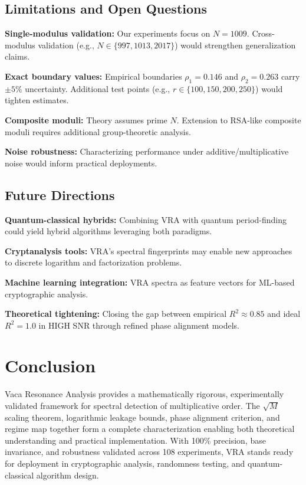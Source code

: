 \documentclass[11pt,twocolumn]{article}
\theoremstyle{definition}
\theoremstyle{remark}
\begin{document}
\subsection{Limitations and Open Questions}

\textbf{Single-modulus validation:} Our experiments focus on $N=1009$. Cross-modulus validation (e.g., $N \in \{997, 1013, 2017\}$) would strengthen generalization claims.

\textbf{Exact boundary values:} Empirical boundaries $\rho_1 = 0.146$ and $\rho_2 = 0.263$ carry $\pm 5\%$ uncertainty. Additional test points (e.g., $r \in \{100, 150, 200, 250\}$) would tighten estimates.

\textbf{Composite moduli:} Theory assumes prime $N$. Extension to RSA-like composite moduli requires additional group-theoretic analysis.

\textbf{Noise robustness:} Characterizing performance under additive/multiplicative noise would inform practical deployments.

\subsection{Future Directions}

\textbf{Quantum-classical hybrids:} Combining VRA with quantum period-finding could yield hybrid algorithms leveraging both paradigms.

\textbf{Cryptanalysis tools:} VRA's spectral fingerprints may enable new approaches to discrete logarithm and factorization problems.

\textbf{Machine learning integration:} VRA spectra as feature vectors for ML-based cryptographic analysis.

\textbf{Theoretical tightening:} Closing the gap between empirical $R^2 \approx 0.85$ and ideal $R^2 = 1.0$ in HIGH SNR through refined phase alignment models.

\section{Conclusion}

Vaca Resonance Analysis provides a mathematically rigorous, experimentally validated framework for spectral detection of multiplicative order. The $\sqrt{M}$ scaling theorem, logarithmic leakage bounds, phase alignment criterion, and regime map together form a complete characterization enabling both theoretical understanding and practical implementation. With 100\% precision, base invariance, and robustness validated across 108 experiments, VRA stands ready for deployment in cryptographic analysis, randomness testing, and quantum-classical algorithm design.



\end{document}
